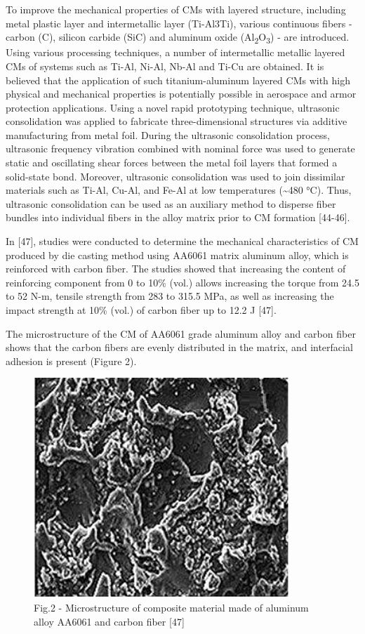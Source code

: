 \begin{multicols}{2}
To improve the mechanical properties of CMs with layered structure,
including metal plastic layer and intermetallic layer (Ti-Al3Ti),
various continuous fibers - carbon (C), silicon carbide (SiC) and
aluminum oxide (Al\textsubscript{2}O\textsubscript{3}) - are introduced.
Using various processing techniques, a number of intermetallic metallic
layered CMs of systems such as Ti-Al, Ni-Al, Nb-Al and Ti-Cu are
obtained. It is believed that the application of such titanium-aluminum
layered CMs with high physical and mechanical properties is potentially
possible in aerospace and armor protection applications. Using a novel
rapid prototyping technique, ultrasonic consolidation was applied to
fabricate three-dimensional structures via additive manufacturing from
metal foil. During the ultrasonic consolidation process, ultrasonic
frequency vibration combined with nominal force was used to generate
static and oscillating shear forces between the metal foil layers that
formed a solid-state bond. Moreover, ultrasonic consolidation was used
to join dissimilar materials such as Ti-Al, Cu-Al, and Fe-Al at low
temperatures (\textasciitilde480 °C). Thus, ultrasonic consolidation can
be used as an auxiliary method to disperse fiber bundles into individual
fibers in the alloy matrix prior to CM formation {[}44-46{]}.

In {[}47{]}, studies were conducted to determine the mechanical
characteristics of CM produced by die casting method using AA6061 matrix
aluminum alloy, which is reinforced with carbon fiber. The studies
showed that increasing the content of reinforcing component from 0 to
10\% (vol.) allows increasing the torque from 24.5 to 52 N-m, tensile
strength from 283 to 315.5 MPa, as well as increasing the impact
strength at 10\% (vol.) of carbon fiber up to 12.2 J {[}47{]}.

The microstructure of the CM of AA6061 grade aluminum alloy and carbon
fiber shows that the carbon fibers are evenly distributed in the matrix,
and interfacial adhesion is present (Figure 2).

\begin{figure}[H]
	\centering
	\includegraphics[width=0.8\columnwidth]{media/chem/image8}
	\caption*{Fig.2 - Microstructure of composite material made of aluminum alloy AA6061 and carbon fiber {[}47{]}}
\end{figure}


\end{multicols}
